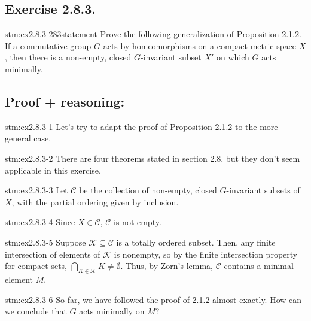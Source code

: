 \subsection*{Exercise 2.8.3.}

\begin{exercise}{stm:ex2.8.3-283statement}
Prove the following generalization of Proposition 2.1.2. If a commutative group $G$ acts by homeomorphisms on a compact metric space $X$, then there is a non-empty, closed $G$-invariant subset $X'$ on which $G$ acts minimally.
\end{exercise}

\subsection*{Proof {\color{blue}+ reasoning}:}

\begin{explanation}{stm:ex2.8.3-1}
Let's try to adapt the proof of Proposition 2.1.2 to the more general case.
\end{explanation}

\begin{explanation}{stm:ex2.8.3-2}
There are four theorems stated in section 2.8, but they don't seem applicable in this exercise.
\end{explanation}

\begin{statement}{stm:ex2.8.3-3}
Let $\mathcal{C}$ be the collection of non-empty, closed $G$-invariant subsets of $X$, with the partial ordering given by inclusion.
\end{statement}

\begin{statement}{stm:ex2.8.3-4}
Since $X \in \mathcal{C}$, $\mathcal{C}$ is not empty.
\end{statement}

\begin{statement}{stm:ex2.8.3-5}
Suppose $\mathcal{K} \subseteq \mathcal{C}$ is a totally ordered subset. Then, any finite intersection of elements of $\mathcal{K}$ is nonempty, so by the finite intersection property for compact sets, $\bigcap_{K \in \mathcal{K}} K \ne \emptyset$. Thus, by Zorn's lemma, $\mathcal{C}$ contains a minimal element $M$.
\end{statement}

\begin{explanation}{stm:ex2.8.3-6}
So far, we have followed the proof of 2.1.2 almost exactly. How can we conclude that $G$ acts minimally on $M$?
\end{explanation}

